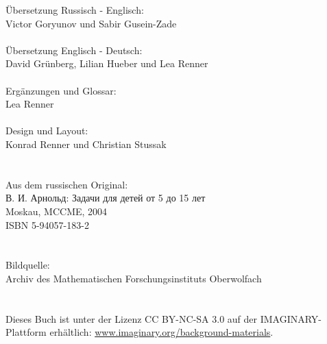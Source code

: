 \documentclass[10pt,a5paper,twoside]{article}
\begin{document}
\clearpage
\null\vfill
{%
\noindent
Übersetzung Russisch - Englisch:\\
\null\quad Victor Goryunov und Sabir Gusein-Zade\\
\\
Übersetzung Englisch - Deutsch:\\
\null\quad David Grünberg, Lilian Hueber und Lea Renner\\
\\
Ergänzungen und Glossar:\\
\null\quad Lea Renner\\
\\
Design und Layout:\\
\null\quad Konrad Renner und Christian Stussak\\
\\
\\
Aus dem russischen Original:\\
\null\quad В. И. Арнольд: Задачи для детей от 5 до 15 лет\\
\null\quad Moskau, MCCME, 2004\\
\null\quad ISBN 5-94057-183-2\\
\\
\\
Bildquelle:\\ 
\null\quad Archiv des Mathematischen Forschungsinstituts Oberwolfach\\
\\
\\
Dieses Buch ist unter der Lizenz CC BY-NC-SA 3.0 auf der IMAG\-I\-NARY-Plattform erhältlich: \href{http://www.imaginary.org/background-materials}{www.imaginary.org/background-materials}.
}
\clearpage
\end{document}
